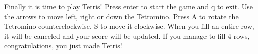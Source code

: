 \documentclass{article}
\begin{document}
Finally it is time to play Tetris! Press enter to start the game and q to exit. Use the arrows to move left, right or down the Tetromino. Press A to rotate the Tetromino counterclockwise, S to move it clockwise.
When you fill an entire row, it will be canceled and your score will be updated.\newline
If you manage to fill 4 rows, congratulations, you just made Tetris!



\end{document}
